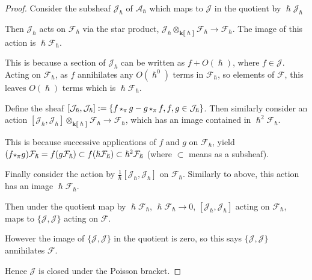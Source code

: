     \begin{proof}
    Consider the subsheaf \(\mathcal{J}_\hslash\)  of \(\mathcal{A}_{\hslash}\) which  maps to \( \mathcal{J}\) in the quotient by \(\hslash \mathcal{J}_{\hslash}\)
    
    Then \( \mathcal{J}_\hslash\) acts on \( \mathcal{F}_\hslash\) via the star product, 
    \( \mathcal{J}_\hslash \otimes_{\mathbf{k} \lBrack \hslash \rBrack } \mathcal{F}_\hslash \rightarrow  \mathcal{F}_\hslash\).  The image of this action is \( \hslash \mathcal{F}_\hslash\).
    
    This is because a section of \( \mathcal{J}_{\hslash}\) can be written as \( f + O(\hslash)\), where \(f \in \mathcal{J}\). Acting on \( \mathcal{F}_{\hslash}\), as \(f\) annihilates any \( O(\hslash^0)\) terms in \( \mathcal{F}_{\hslash}\), so elements of \( \mathcal{F}\), this leaves \( O(\hslash)\) terms which is \(\hslash \mathcal{F}_{\hslash}\).
    
    Define the sheaf \(  [\mathcal{J}_{\hslash},\mathcal{J}_{\hslash} ]:=  \{  f \, \starp_{\pi} \, g - g \, \starp_{\pi}\,  f, f,g \in \mathcal{J}_{\hslash}\}\). Then similarly consider an action 
    \(  [\mathcal{J}_\hslash  ,   \mathcal{J}_\hslash  ]  \otimes_{\mathbf{k}\lBrack\hslash\rBrack} \mathcal{F}_\hslash \rightarrow  \mathcal{F}_\hslash\), which has an image contained in \( \hslash^2 \mathcal{F}_{\hslash}\).
    
    This is because successive applications of \(f\) and \(g\) on \( \mathcal{F}_{\hslash}\), yield \( (f \starp_{\pi} g) \mathcal{F}_{\hslash} = f ( g \mathcal{F}_{\hslash}) \subset f ( \hslash \mathcal{F}_{\hslash} ) \subset \hslash^2 \mathcal{F}_{\hslash}\) (where \( \subset\) means as a subsheaf).
    
    
    Finally consider the action by
    \( \frac{1}{\hslash} [ \mathcal{J}_\hslash, \mathcal{J}_\hslash ] \) on \( \mathcal{F}_{\hslash}\). Similarly to above, this action has an image \( \hslash \mathcal{F}_{\hslash}\).
    
    Then under the quotient map by \( \hslash \mathcal{F}_{\hslash}\),  \(\hslash \mathcal{F}_\hslash \rightarrow 0\), \( [\mathcal{J}_{\hslash} ,\mathcal{J}_{\hslash}]\) acting on \( \mathcal{F}_{\hslash}\), maps to \( \{\mathcal{J},\mathcal{J}\} \) acting on \( \mathcal{F}\). 
    
    However the image of \(\{\mathcal{J},\mathcal{J}\}\) in the quotient is zero, so this says  \(\{\mathcal{J},\mathcal{J}\}\) annihilates \( \mathcal{F}\).

    Hence \( \mathcal{J} \) is closed under the Poisson bracket.
    \end{proof}
    
